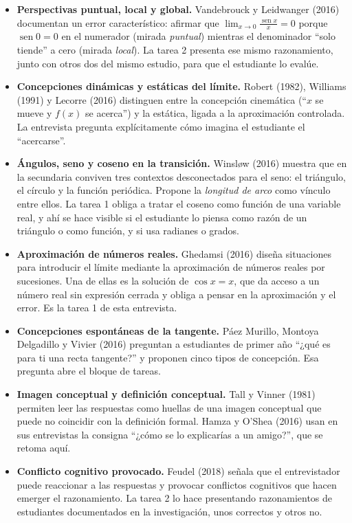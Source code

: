 \documentclass[11pt,letterpaper]{article}
\DeclareMathOperator{\seno}{sen}
\newcommand{\limsen}{\displaystyle\lim_{x\to 0}\frac{\seno x}{x}}
\newcounter{preg}
\begin{document}
\begin{itemize}
  \item \textbf{Perspectivas puntual, local y global.} Vandebrouck y Leidwanger (2016) documentan un error característico: afirmar que $\limsen = 0$ porque $\seno 0 = 0$ en el numerador (mirada \emph{puntual}) mientras el denominador ``solo tiende'' a cero (mirada \emph{local}). La tarea 2 presenta ese mismo razonamiento, junto con otros dos del mismo estudio, para que el estudiante lo evalúe.
  \item \textbf{Concepciones dinámicas y estáticas del límite.} Robert (1982), Williams (1991) y Lecorre (2016) distinguen entre la concepción cinemática (``$x$ se mueve y $f(x)$ se acerca'') y la estática, ligada a la aproximación controlada. La entrevista pregunta explícitamente cómo imagina el estudiante el ``acercarse''.
  \item \textbf{Ángulos, seno y coseno en la transición.} Winsløw (2016) muestra que en la secundaria conviven tres contextos desconectados para el seno: el triángulo, el círculo y la función periódica. Propone la \emph{longitud de arco} como vínculo entre ellos. La tarea 1 obliga a tratar el coseno como función de una variable real, y ahí se hace visible si el estudiante lo piensa como razón de un triángulo o como función, y si usa radianes o grados.
  \item \textbf{Aproximación de números reales.} Ghedamsi (2016) diseña situaciones para introducir el límite mediante la aproximación de números reales por sucesiones. Una de ellas es la solución de $\cos x = x$, que da acceso a un número real sin expresión cerrada y obliga a pensar en la aproximación y el error. Es la tarea 1 de esta entrevista.
  \item \textbf{Concepciones espontáneas de la tangente.} Páez Murillo, Montoya Delgadillo y Vivier (2016) preguntan a estudiantes de primer año ``¿qué es para ti una recta tangente?'' y proponen cinco tipos de concepción. Esa pregunta abre el bloque de tareas.
  \item \textbf{Imagen conceptual y definición conceptual.} Tall y Vinner (1981) permiten leer las respuestas como huellas de una imagen conceptual que puede no coincidir con la definición formal. Hamza y O'Shea (2016) usan en sus entrevistas la consigna ``¿cómo se lo explicarías a un amigo?'', que se retoma aquí.
  \item \textbf{Conflicto cognitivo provocado.} Feudel (2018) señala que el entrevistador puede reaccionar a las respuestas y provocar conflictos cognitivos que hacen emerger el razonamiento. La tarea 2 lo hace presentando razonamientos de estudiantes documentados en la investigación, unos correctos y otros no.

\end{itemize}
\end{document}
